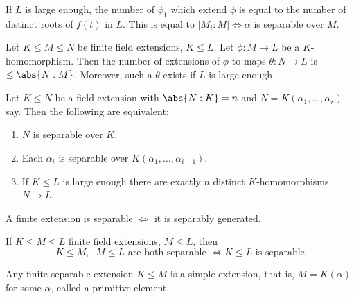 \documentclass{article}
\begin{document}
\begin{ncor}\label{cor:2.9}
    If $L$ is large enough, the number of $\phi_1$ which extend $\phi$ is equal to the number of distinct roots of $f(t)$ in $L$.
    This is equal to $|M_i:M| \iff \alpha$ is separable over $M$.
\end{ncor}

\begin{ncor}\label{cor:2.10}
    Let $K \leq M \leq N$ be finite field extensions, $K \leq L$. Let $\phi: M \to L$ be a $K$-homomorphism.
    Then the number of extensions of $\phi$ to maps $\theta:N \to L$ is $\leq \abs{N:M}$.
    Moreover, such a $\theta$ exists if $L$ is large enough.
\end{ncor}


\begin{nlemma}\label{lem:2.12}
    Let $K \leq N$ be a field extension with $\abs{N:K} = n$ and $N = K(\alpha_1, \dotsc, \alpha_r)$ say.
    Then the following are equivalent:
    \begin{enumerate}[label=(\roman*)]
        \item $N$ is separable over $K$.
        \item Each $\alpha_i$ is separable over $K(\alpha_1, \dotsc, \alpha_{i-1})$.
        \item If $K \leq L$ is large enough there are exactly $n$ distinct $K$-homomorphisms $N \to L$.
    \end{enumerate}
\end{nlemma}


\begin{ncor}\label{cor:2.14}
    A finite extension is separable $\iff$ it is separably generated.
\end{ncor}

\begin{nlemma}\label{lem:2.15}
    If $K \leq M \leq L$ finite field extensions, $M \leq L$, then
    \begin{equation*}
        K \leq M, \; \; M \leq L \text{ are both separable } \iff K \leq L \text{ is separable}
    \end{equation*}
\end{nlemma}



\begin{nthm}\label{thm:2.17}
    Any finite separable extension $K \leq M$ is a simple extension, that is, $M = K(\alpha)$ for some $\alpha$, called a primitive element.
\end{nthm}
\end{document}
